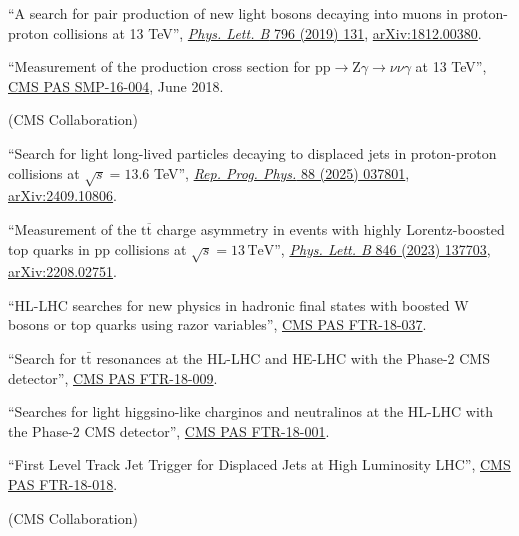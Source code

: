\begin{description}[leftmargin=12pt,font=\normalfont\textit]
\begin{description}[leftmargin=12pt,font=\normalfont,labelsep=0em]
\item \begin{sloppypar}``A search for pair production of new light bosons decaying into muons in proton-proton collisions at 13 TeV'', \href{http://dx.doi.org/10.1016/j.physletb.2019.07.013}{\emph{Phys. Lett. B} 796 (2019) 131}, \href{https://arxiv.org/abs/1812.00380}{arXiv:1812.00380}.\end{sloppypar}
\item ``Measurement of the production cross section for $\text{p}\text{p} \to \text{Z}\gamma \to \nu\nu\gamma$ at 13 TeV'', \href{https://cds.cern.ch/record/2204922}{CMS PAS SMP-16-004}, June 2018.
\end{description}
\item[CMS Certified Language Editor (CCLE):] (CMS Collaboration)
\begin{description}[leftmargin=12pt,font=\normalfont,labelsep=0em]
\item ``Search for light long-lived particles decaying to displaced jets in proton-proton collisions at $\sqrt{s} = 13.6$ TeV'', \href{https://dx.doi.org/10.1088/1361-6633/adaa13}{\emph{Rep. Prog. Phys.} 88 (2025) 037801}, \href{https://arxiv.org/abs/2409.10806}{arXiv:2409.10806}.
\item ``Measurement of the $\text{t}\overline{\text{t}}$ charge asymmetry in events with highly Lorentz-boosted top quarks in pp collisions at $\sqrt{s} = 13\,\text{TeV}$'', \href{https://doi.org/10.1016/j.physletb.2023.137703}{\emph{Phys. Lett. B} 846 (2023) 137703}, \href{https://arxiv.org/abs/2208.02751}{arXiv:2208.02751}.
\item ``HL-LHC searches for new physics in hadronic final states with boosted W bosons or top quarks using razor variables'', \href{https://cds.cern.ch/record/2658262}{CMS PAS FTR-18-037}.
\item ``Search for $\text{t}\bar{\text{t}}$ resonances at the HL-LHC and HE-LHC with the Phase-2 CMS detector'', \href{https://cds.cern.ch/record/2649032}{CMS PAS FTR-18-009}.
\item ``Searches for light higgsino-like charginos and neutralinos at the HL-LHC with the Phase-2 CMS detector'', \href{https://cds.cern.ch/record/2648538}{CMS PAS FTR-18-001}.
\item ``First Level Track Jet Trigger for Displaced Jets at High Luminosity LHC'', \href{https://cds.cern.ch/record/2647987}{CMS PAS FTR-18-018}.
\end{description}
\item[FNAL institutional review leader:] (CMS Collaboration)

\end{description}
